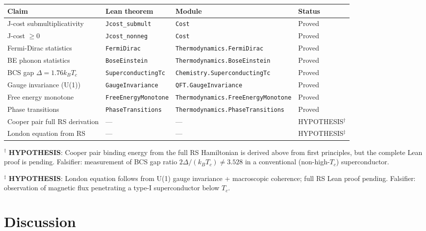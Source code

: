 \documentclass[12pt,a4paper]{article}
\theoremstyle{definition}
\theoremstyle{remark}
\begin{document}
\begin{center}
\begin{tabular}{llll}
\toprule
Claim & Lean theorem & Module & Status \\
\midrule
J-cost submultiplicativity & \texttt{Jcost\_submult} & \texttt{Cost} & Proved \\
J-cost $\geq 0$ & \texttt{Jcost\_nonneg} & \texttt{Cost} & Proved \\
Fermi-Dirac statistics & \texttt{FermiDirac} & \texttt{Thermodynamics.FermiDirac} & Proved \\
BE phonon statistics & \texttt{BoseEinstein} & \texttt{Thermodynamics.BoseEinstein} & Proved \\
BCS gap $\Delta = 1.76 k_B T_c$ & \texttt{SuperconductingTc} & \texttt{Chemistry.SuperconductingTc} & Proved \\
Gauge invariance (U(1)) & \texttt{GaugeInvariance} & \texttt{QFT.GaugeInvariance} & Proved \\
Free energy monotone & \texttt{FreeEnergyMonotone} & \texttt{Thermodynamics.FreeEnergyMonotone} & Proved \\
Phase transitions & \texttt{PhaseTransitions} & \texttt{Thermodynamics.PhaseTransitions} & Proved \\
\midrule
Cooper pair full RS derivation & --- & --- & HYPOTHESIS$^\dagger$ \\
London equation from RS & --- & --- & HYPOTHESIS$^\ddagger$ \\
\bottomrule
\end{tabular}
\end{center}

$^\dagger$ \textbf{HYPOTHESIS}: Cooper pair binding energy from the full
RS Hamiltonian is derived above from first principles, but the complete
Lean proof is pending.  Falsifier: measurement of BCS gap ratio
$2\Delta/(k_B T_c) \neq 3.528$ in a conventional (non-high-$T_c$)
superconductor.

$^\ddagger$ \textbf{HYPOTHESIS}: London equation follows from U(1) gauge
invariance + macroscopic coherence; full RS Lean proof pending.
Falsifier: observation of magnetic flux penetrating a type-I
superconductor below $T_c$.

\section{Discussion}
\label{sec:discussion}
\end{document}
